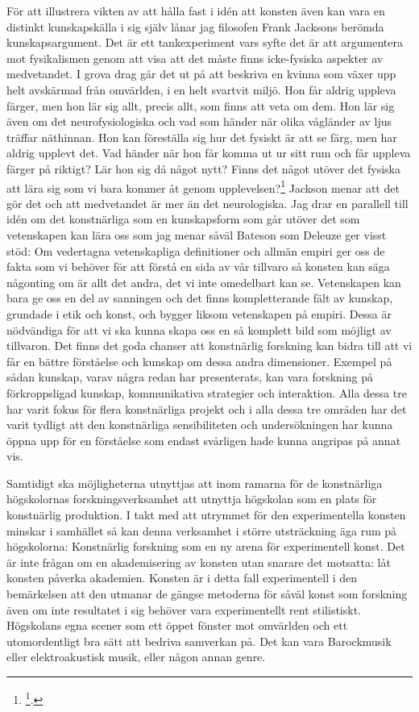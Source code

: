 \documentclass[11pt]{article}
\begin{document}
För att illustrera vikten av att hålla fast i idén att konsten även kan
vara en distinkt kunskapskälla i sig själv lånar jag filosofen Frank
Jacksons berömda kunskapsargument. Det är ett tankexperiment vars syfte
det är att argumentera mot fysikalismen genom att visa att det måste
finns icke-fysiska aspekter av medvetandet. I grova drag går det ut på
att beskriva en kvinna som växer upp helt avskärmad från omvärlden, i en
helt svartvit miljö. Hon får aldrig uppleva färger, men hon lär sig
allt, precis allt, som finns att veta om dem. Hon lär sig även om det
neurofysiologiska och vad som händer när olika vågländer av ljus träffar
näthinnan. Hon kan föreställa sig hur det fysiskt är att se färg, men
har aldrig upplevt det. Vad händer när hon får komma ut ur sitt rum och
får uppleva färger på riktigt? Lär hon sig då något nytt? Finns det
något utöver det fysiska att lära sig som vi bara kommer åt genom
upplevelsen?\footnote{\footcite[s.130]{Jackson1982}.} Jackson menar att det gör det och att medvetandet är
mer än det neurologiska. Jag drar en parallell till idén om det
konstnärliga som en kunskapsform som går utöver det som vetenskapen kan
lära oss som jag menar såväl Bateson som Deleuze ger visst stöd: Om
vedertagna vetenskapliga definitioner och allmän empiri ger oss de fakta
som vi behöver för att förstå en sida av vår tillvaro så konsten kan
säga någonting om är allt det andra, det vi inte omedelbart kan se.
Vetenskapen kan bara ge oss en del av sanningen och det finns
kompletterande fält av kunskap, grundade i etik och konst, och bygger
liksom vetenskapen på empiri. Dessa är nödvändiga för att vi ska kunna
skapa oss en så komplett bild som möjligt av tillvaron. Det finns det
goda chanser att konstnärlig forskning kan bidra till att vi får en
bättre förståelse och kunskap om dessa andra dimensioner. Exempel på
sådan kunskap, varav några redan har presenterats, kan vara forskning på
förkroppsligad kunskap, kommunikativa strategier och interaktion. Alla
dessa tre har varit fokus för flera konstnärliga projekt och i alla
dessa tre områden har det varit tydligt att den konstnärliga
sensibiliteten och undersökningen har kunna öppna upp för en förståelse
som endast svårligen hade kunna angripas på annat vis.

Samtidigt ska möjligheterna utnyttjas att inom ramarna för de
konstnärliga högskolornas forskningsverksamhet att utnyttja högskolan
som en plats för konstnärlig produktion. I takt med att utrymmet för den
experimentella konsten minskar i samhället så kan denna verksamhet i
större utsträckning äga rum på högskolorna: Konstnärlig forskning som en
ny arena för experimentell konst. Det är inte frågan om en akademisering
av konsten utan snarare det motsatta: låt konsten påverka akademien.
Konsten är i detta fall experimentell i den bemärkelsen att den utmanar
de gängse metoderna för såväl konst som forskning även om inte
resultatet i sig behöver vara experimentellt rent stilistiskt.
Högskolans egna scener som ett öppet fönster mot omvärlden och ett
utomordentligt bra sätt att bedriva samverkan på. Det kan vara
Barockmusik eller elektroakustisk musik, eller någon annan genre.
\end{document}
